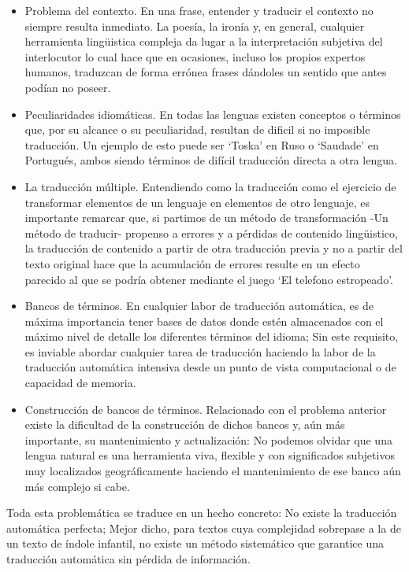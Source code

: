 \begin{itemize}
\item Problema del contexto. En una frase, entender y traducir el contexto
  no siempre resulta inmediato. La poesía, la ironía y, en general, cualquier
  herramienta lingüistica compleja da lugar a la interpretación subjetiva del
  interlocutor lo cual hace que en ocasiones, incluso los propios expertos
  humanos, traduzcan de forma errónea frases dándoles un sentido que antes
  podían no poseer.
\item Peculiaridades idiomáticas. En todas las lenguas existen conceptos o
  términos que, por su alcance o su peculiaridad, resultan de dificil si no
  imposible traducción. Un ejemplo de esto puede ser `Toska' en Ruso o
  `Saudade' en Portugués, ambos siendo términos de difícil traducción
  directa a otra lengua.
\item La traducción múltiple. Entendiendo como la traducción como el
  ejercicio de transformar elementos de un lenguaje en elementos de otro
  lenguaje, es importante remarcar que, si partimos de un método de
  transformación -Un método de traducir- propenso a errores y a pérdidas de
  contenido lingüistico, la traducción de contenido a partir de otra
  traducción previa y no a partir del texto original hace que la acumulación
  de errores resulte en un efecto parecido al que se podría obtener mediante
  el juego `El telefono estropeado'.
\item Bancos de términos. En cualquier labor de traducción automática, es de
  máxima importancia tener bases de datos donde estén almacenados con el máximo
  nivel de detalle los diferentes términos del idioma; Sin este requisito, es
  inviable abordar cualquier tarea de traducción haciendo la labor de la
  traducción automática intensiva desde un punto de vista computacional o de
  capacidad de memoria.
\item Construcción de bancos de términos. Relacionado con el problema anterior
  existe la dificultad de la construcción de dichos bancos y, aún más
  importante, su mantenimiento y actualización: No podemos olvidar que una
  lengua natural es una herramienta viva, flexible y con significados subjetivos
  muy localizados geográficamente haciendo el mantenimiento de ese banco aún más
  complejo si cabe.
\end{itemize}
Toda esta problemática se traduce en un hecho concreto:
No existe la traducción automática perfecta; Mejor dicho, para textos cuya complejidad
sobrepase a la de un texto de índole infantil, no existe un método sistemático que garantice
una traducción automática sin pérdida de información.

